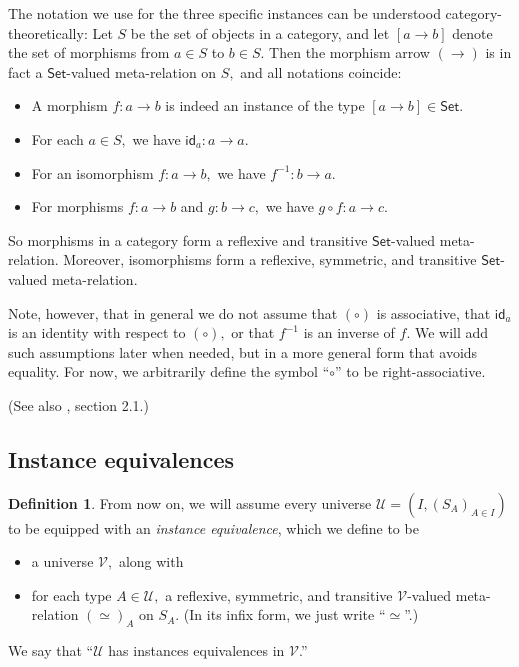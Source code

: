 \documentclass[a4paper]{article}
\theoremstyle{definition}
\newtheorem{definition}{Definition}[section]
\theoremstyle{remark}
\newcommand{\defn}{\emph}
\renewcommand{\equiv}{\simeq}
\newcommand{\U}{\mathcal{U}}
\newcommand{\V}{\mathcal{V}}
\newcommand{\nm}{\mathsf}
\newcommand{\universe}{\nm}
\newcommand{\Set}{\universe{Set}}
\newcommand{\id}{\nm{id}}
\begin{document}
The notation we use for the three specific instances can be understood category-theoretically:
Let $S$ be the set of objects in a category, and let $[a \to b]$ denote the set of morphisms
from $a \in S$ to $b \in S.$ Then the morphism arrow $(\to)$ is in fact a $\Set$-valued
meta-relation on $S,$ and all notations coincide:
\begin{itemize}
  \item A morphism $f : a \to b$ is indeed an instance of the type $[a \to b] \in \Set.$
  \item For each $a \in S,$ we have $\id_a : a \to a.$
  \item For an isomorphism $f : a \to b,$ we have $f^{-1} : b \to a.$
  \item For morphisms $f : a \to b$ and $g : b \to c,$ we have $g \circ f : a \to c.$
\end{itemize}

So morphisms in a category form a reflexive and transitive $\Set$-valued meta-relation.
Moreover, isomorphisms form a reflexive, symmetric, and transitive $\Set$-valued meta-relation.

Note, however, that in general we do not assume that $(\circ)$ is associative, that $\id_a$ is
an identity with respect to $(\circ),$ or that $f^{-1}$ is an inverse of $f.$ We will add such
assumptions later when needed, but in a more general form that avoids equality. For now, we
arbitrarily define the symbol ``$\circ$'' to be right-associative.

(See also \cite{hottbook}, section 2.1.)

\subsection{Instance equivalences}

\begin{definition}
  From now on, we will assume every universe $\U = (I, (S_A)_{A \in I})$ to be equipped with an
  \defn{instance equivalence}, which we define to be
  \begin{itemize}
    \item a universe $\V,$ along with
    \item for each type $A \in \U,$ a reflexive, symmetric, and transitive $\V$-valued
    meta-relation $(\equiv)_A$ on $S_A.$ (In its infix form, we just write ``$\equiv$''.)
  \end{itemize}
\end{definition}

We say that ``$\U$ has instances equivalences in $\V$.''
\end{document}
